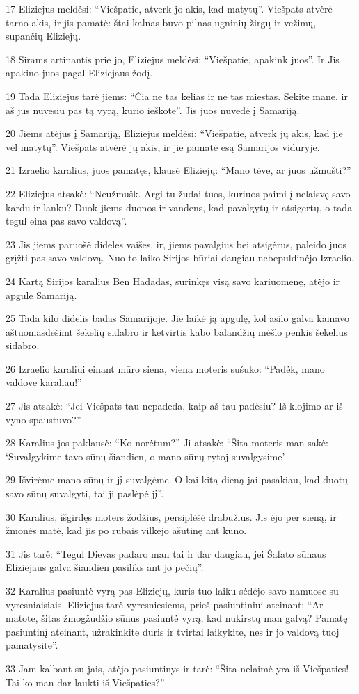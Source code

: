 \par 17 Eliziejus meldėsi: “Viešpatie, atverk jo akis, kad matytų”. Viešpats atvėrė tarno akis, ir jis pamatė: štai kalnas buvo pilnas ugninių žirgų ir vežimų, supančių Eliziejų. 
\par 18 Sirams artinantis prie jo, Eliziejus meldėsi: “Viešpatie, apakink juos”. Ir Jis apakino juos pagal Eliziejaus žodį. 
\par 19 Tada Eliziejus tarė jiems: “Čia ne tas kelias ir ne tas miestas. Sekite mane, ir aš jus nuvesiu pas tą vyrą, kurio ieškote”. Jis juos nuvedė į Samariją. 
\par 20 Jiems atėjus į Samariją, Eliziejus meldėsi: “Viešpatie, atverk jų akis, kad jie vėl matytų”. Viešpats atvėrė jų akis, ir jie pamatė esą Samarijos viduryje. 
\par 21 Izraelio karalius, juos pamatęs, klausė Eliziejų: “Mano tėve, ar juos užmušti?” 
\par 22 Eliziejus atsakė: “Neužmušk. Argi tu žudai tuos, kuriuos paimi į nelaisvę savo kardu ir lanku? Duok jiems duonos ir vandens, kad pavalgytų ir atsigertų, o tada tegul eina pas savo valdovą”. 
\par 23 Jis jiems paruošė dideles vaišes, ir, jiems pavalgius bei atsigėrus, paleido juos grįžti pas savo valdovą. Nuo to laiko Sirijos būriai daugiau nebepuldinėjo Izraelio. 
\par 24 Kartą Sirijos karalius Ben Hadadas, surinkęs visą savo kariuomenę, atėjo ir apgulė Samariją. 
\par 25 Tada kilo didelis badas Samarijoje. Jie laikė ją apgulę, kol asilo galva kainavo aštuoniasdešimt šekelių sidabro ir ketvirtis kabo balandžių mėšlo penkis šekelius sidabro. 
\par 26 Izraelio karaliui einant mūro siena, viena moteris sušuko: “Padėk, mano valdove karaliau!” 
\par 27 Jis atsakė: “Jei Viešpats tau nepadeda, kaip aš tau padėsiu? Iš klojimo ar iš vyno spaustuvo?” 
\par 28 Karalius jos paklausė: “Ko norėtum?” Ji atsakė: “Šita moteris man sakė: ‘Suvalgykime tavo sūnų šiandien, o mano sūnų rytoj suvalgysime’. 
\par 29 Išvirėme mano sūnų ir jį suvalgėme. O kai kitą dieną jai pasakiau, kad duotų savo sūnų suvalgyti, tai ji paslėpė jį”. 
\par 30 Karalius, išgirdęs moters žodžius, persiplėšė drabužius. Jis ėjo per sieną, ir žmonės matė, kad jis po rūbais vilkėjo ašutinę ant kūno. 
\par 31 Jis tarė: “Tegul Dievas padaro man tai ir dar daugiau, jei Šafato sūnaus Eliziejaus galva šiandien pasiliks ant jo pečių”. 
\par 32 Karalius pasiuntė vyrą pas Eliziejų, kuris tuo laiku sėdėjo savo namuose su vyresniaisiais. Eliziejus tarė vyresniesiems, prieš pasiuntiniui ateinant: “Ar matote, šitas žmogžudžio sūnus pasiuntė vyrą, kad nukirstų man galvą? Pamatę pasiuntinį ateinant, užrakinkite duris ir tvirtai laikykite, nes ir jo valdovą tuoj pamatysite”. 
\par 33 Jam kalbant su jais, atėjo pasiuntinys ir tarė: “Šita nelaimė yra iš Viešpaties! Tai ko man dar laukti iš Viešpaties?”



